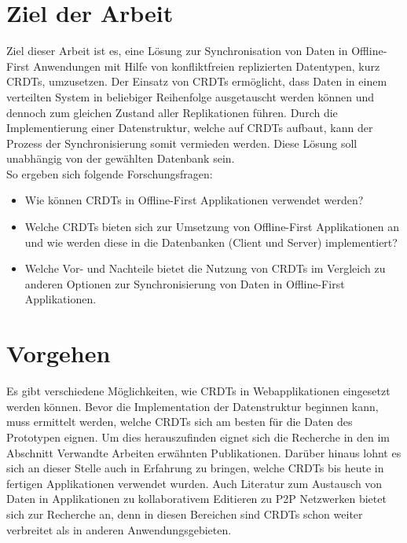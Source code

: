 \documentclass[a4paper, 12pt]{scrreprt}
\begin{document}
\section{Ziel der Arbeit} 

Ziel dieser Arbeit ist es, eine Lösung zur Synchronisation von Daten in Offline-First Anwendungen mit Hilfe von konfliktfreien replizierten Datentypen, kurz CRDTs, umzusetzen. Der Einsatz von CRDTs ermöglicht, dass Daten in einem verteilten System in beliebiger Reihenfolge ausgetauscht werden können und dennoch zum gleichen Zustand aller Replikationen führen. Durch die Implementierung einer Datenstruktur, welche auf CRDTs aufbaut, kann der Prozess der Synchronisierung somit vermieden werden. Diese Lösung soll unabhängig von der gewählten Datenbank sein.\\

So ergeben sich folgende Forschungsfragen:

\begin{itemize}
	\item Wie können CRDTs in Offline-First Applikationen verwendet werden?
	\item Welche CRDTs bieten sich zur Umsetzung von Offline-First Applikationen an und wie werden diese in die Datenbanken (Client und Server) implementiert?
	\item Welche Vor- und Nachteile bietet die Nutzung von CRDTs im Vergleich zu anderen Optionen zur Synchronisierung von Daten in Offline-First Applikationen.
\end{itemize}

\section{Vorgehen}

Es gibt verschiedene Möglichkeiten, wie CRDTs in Webapplikationen eingesetzt werden können. Bevor die Implementation der Datenstruktur beginnen kann, muss ermittelt werden, welche CRDTs sich am besten für die Daten des Prototypen eignen. Um dies herauszufinden eignet sich die Recherche in den im Abschnitt Verwandte Arbeiten erwähnten Publikationen. Darüber hinaus lohnt es sich an dieser Stelle auch in Erfahrung zu bringen, welche CRDTs bis heute in fertigen Applikationen verwendet wurden. Auch Literatur zum Austausch von Daten in Applikationen zu kollaborativem Editieren zu P2P Netzwerken bietet sich zur Recherche an, denn in diesen Bereichen sind CRDTs schon weiter verbreitet als in anderen Anwendungsgebieten.\\
\end{document}
